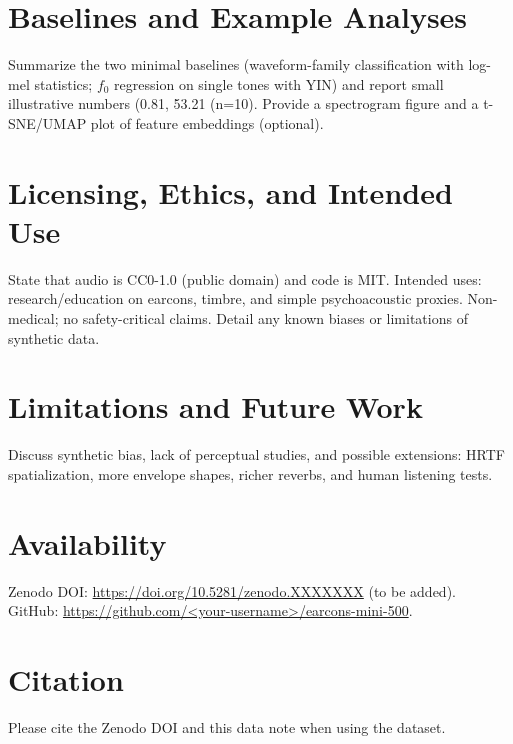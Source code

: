 \documentclass[11pt]{article}
\begin{document}
\section{Baselines and Example Analyses}
Summarize the two minimal baselines (waveform-family classification with log-mel statistics; $f_0$ regression on single tones with YIN) and report small illustrative numbers (0.81, 53.21 (n=10). Provide a spectrogram figure and a t-SNE/UMAP plot of feature embeddings (optional).

\section{Licensing, Ethics, and Intended Use}
State that audio is CC0-1.0 (public domain) and code is MIT. Intended uses: research/education on earcons, timbre, and simple psychoacoustic proxies. Non-medical; no safety-critical claims. Detail any known biases or limitations of synthetic data.

\section{Limitations and Future Work}
Discuss synthetic bias, lack of perceptual studies, and possible extensions: HRTF spatialization, more envelope shapes, richer reverbs, and human listening tests.

\section*{Availability}
Zenodo DOI: \url{https://doi.org/10.5281/zenodo.XXXXXXX} (to be added).\\
GitHub: \url{https://github.com/<your-username>/earcons-mini-500}.

\section*{Citation}
Please cite the Zenodo DOI and this data note when using the dataset.
\end{document}
